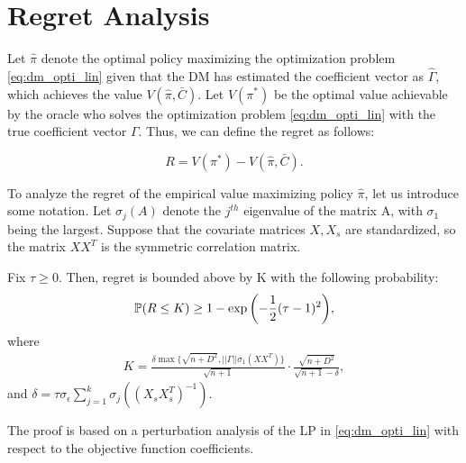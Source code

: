 \documentclass[11pt,a4paper]{article}
\begin{document}

\section{Regret Analysis}
Let $\hat \pi$ denote the optimal policy maximizing the optimization problem \eqref{eq:dm_opti_lin} given that the DM has estimated the coefficient vector as $\hat{\Gamma} $, which achieves the value $V(\hat \pi, \bar{C})$. Let $V(\pi^*)$ be the optimal value achievable by the oracle who solves the optimization problem \eqref{eq:dm_opti_lin} with the true coefficient vector $\Gamma$. Thus, we can define the regret as follows:

$$R = V(\pi^*) - V(\hat \pi, \bar{C}) .$$

To analyze the regret of the empirical value maximizing policy $\hat \pi$, let us introduce some notation. Let $\sigma_j( A)$ denote the $j^{th}$ eigenvalue of the matrix A, with $\sigma_1$ being the largest. Suppose that the covariate matrices $X, X_s$ are standardized, so the matrix $X X^T$ is the symmetric correlation matrix. 
\begin{thm}
Fix $\tau \geq 0$. Then, regret is bounded above by K with the following probability:
\begin{align}
\mathbb{P}(R \leq K) \geq 1 - \exp{\left( -\frac{1}{2} (\tau -1 )^2 \right)},
\end{align}
where
\begin{align}\label{eq:Kterm}
K =\frac{  \delta  \max \{\sqrt{n+D^2}, || \Gamma || \sigma_{1} (X X^T) \} }{ \sqrt{n+1} } \cdot \frac{ \sqrt{n+D^2} }{\sqrt{n+1} - \delta },
\end{align}
and $\delta = \tau \sigma_\epsilon \sum_{j=1}^k \sigma_j( (X_s X_s^T)^{-1})$.
\end{thm}

The proof is based on a perturbation analysis of the LP in \eqref{eq:dm_opti_lin} with respect to the objective function coefficients. 
\end{document}
